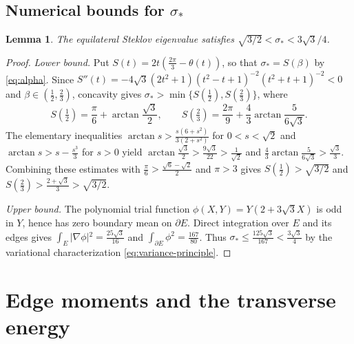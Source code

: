 \documentclass[11pt,reqno]{amsart}
\numberwithin{equation}{section}
\newtheorem{lemma}[lemma]{Lemma}
\theoremstyle{remark}
\begin{document}
\subsection{Numerical bounds for \texorpdfstring{$\sigma_*$}{sigma*}}
\begin{lemma}\label{lem:sigma-bounds}
The equilateral Steklov eigenvalue satisfies $\sqrt{3/2}<\sigma_*<3\sqrt3/4$.
\end{lemma}
\begin{proof}
\emph{Lower bound.} Put $S(t)=2t(\frac{2\pi}3-\theta(t))$, so that
$\sigma_*=S(\beta)$ by \eqref{eq:alpha}. Since
$S''(t)=-4\sqrt3(2t^2+1)(t^2-t+1)^{-2}(t^2+t+1)^{-2}<0$ and
$\beta\in(\frac12,\frac23)$, concavity gives
$\sigma_*>\min\{S(\frac12),S(\frac23)\}$, where
\[S(\tfrac12)=\frac\pi6+\arctan\frac{\sqrt3}2,\qquad S(\tfrac23)=\frac{2\pi}9+\frac43\arctan\frac5{6\sqrt3}.\]
The elementary inequalities $\arctan s>\frac{s(6+s^2)}{3(2+s^2)}$ for
$0<s<\sqrt2$ and $\arctan s>s-\frac{s^3}3$ for $s>0$ yield
$\arctan\frac{\sqrt3}2>\frac{9\sqrt3}{22}>\frac1{\sqrt2}$ and
$\frac43\arctan\frac5{6\sqrt3}>\frac{\sqrt3}3$. Combining these estimates with
$\frac\pi6>\frac{\sqrt6-\sqrt2}2$ and $\pi>3$ gives
$S(\frac12)>\sqrt{3/2}$ and $S(\frac23)>\frac{2+\sqrt3}3>\sqrt{3/2}$.

\emph{Upper bound.} The polynomial trial function $\phi(X,Y)=Y(2+3\sqrt3X)$ is
odd in $Y$, hence has zero boundary mean on $\partial E$. Direct integration over
$E$ and its edges gives $\int_E\vert{}\nabla\phi\vert{}^2=\frac{25\sqrt3}{16}$ and
$\int_{\partial E}\phi^2=\frac{167}{80}$. Thus
$\sigma_*\le\frac{125\sqrt3}{167}<\frac{3\sqrt3}4$ by the variational characterization
\eqref{eq:variance-principle}.
\end{proof}

\section{Edge moments and the transverse energy}\label{sec:moments}
\end{document}
